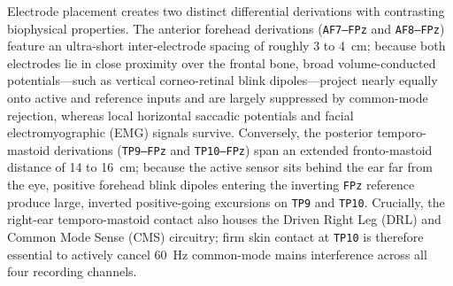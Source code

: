\documentclass[11pt,letterpaper]{article}
\begin{document}
Electrode placement creates two distinct differential derivations with contrasting biophysical properties. The anterior forehead derivations (\texttt{AF7--FPz} and \texttt{AF8--FPz}) feature an ultra-short inter-electrode spacing of roughly 3 to 4~cm; because both electrodes lie in close proximity over the frontal bone, broad volume-conducted potentials---such as vertical corneo-retinal blink dipoles---project nearly equally onto active and reference inputs and are largely suppressed by common-mode rejection, whereas local horizontal saccadic potentials and facial electromyographic (EMG) signals survive. Conversely, the posterior temporo-mastoid derivations (\texttt{TP9--FPz} and \texttt{TP10--FPz}) span an extended fronto-mastoid distance of 14 to 16~cm; because the active sensor sits behind the ear far from the eye, positive forehead blink dipoles entering the inverting \texttt{FPz} reference produce large, inverted positive-going excursions on \texttt{TP9} and \texttt{TP10}. Crucially, the right-ear temporo-mastoid contact also houses the Driven Right Leg (DRL) and Common Mode Sense (CMS) circuitry; firm skin contact at \texttt{TP10} is therefore essential to actively cancel 60~Hz common-mode mains interference across all four recording channels.
\end{document}
